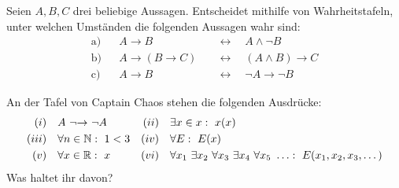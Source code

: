 	
	
\begin{aufg}[Wahrheitstafeln]
Seien $A,B,C$ drei beliebige Aussagen. Entscheidet mithilfe von Wahrheitstafeln, unter welchen Umständen die folgenden Aussagen wahr sind:
\begin{align*}
\text{a)} && A\to B\quad & \leftrightarrow \quad A\land \neg B \\
\text{b)} && A\to (B\to C) \quad&\leftrightarrow\quad (A\land B)\to C \\
\text{c)} && A\to B \quad&\leftrightarrow\quad \neg A \to \neg B
\end{align*}
\end{aufg}





	
\begin{comment}
\subsection{Aufgabe}
Seien $A,B,C$ drei beliebige Aussagen. Zeigt mithilfe einer Wahrheitstafel, dass die Formel
\[ (A\to B)\lor (B\to C) \]
eine Tautologie ist. Seien nun konkret
\begin{itemize}
 \item $A:=$ „Der Döner wurde in Deutschland erfunden“.
 \item $B:=$ „Heute ist Mittwoch“.
\end{itemize}
Wie muss man „$\to$“ und „$\lor$“ auffassen, damit die Tatsache, dass $(A\to B)\lor (B\to A)$ eine Tautologie ist, kein Nonsens ist? \\%
Eine Liste weiterer Tautologien des Implikationspfeils, die kontraintuitiv wirken können, findet ihr \href{https://de.wikipedia.org/wiki/Paradoxien_der_materialen_Implikation}{auf der deutschen Wikipedia}. Der nächste Vortrag wird euch dabei helfen, sie besser zu verstehen.
\end{comment}


\begin{aufg}
An der Tafel von Captain Chaos stehen die folgenden Ausdrücke:
\begin{align*}
(i)\quad& A\ {\neg}{\to}\ \neg A&(ii)\quad& \exists x\in x:\ x(x)  \\
 (iii)\quad&   \forall n\in \Nz:\ 1<3 & (iv)\quad& \forall E :\ E(x) \\
  (v)\quad& \forall x\in \Rz :\ x &(vi)\quad& \forall x_1\ \exists x_2\ \forall x_3\ \exists x_4\ \forall x_5\ \ldots:\ E(x_1,x_2,x_3,\dots)
\end{align*}
Was haltet ihr davon?
\end{aufg}
	
